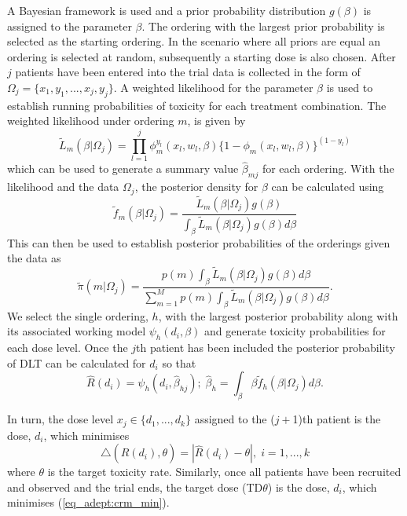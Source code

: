 A Bayesian framework is used and a prior probability distribution $g(\beta)$ is assigned to the parameter $\beta$. The ordering with the largest prior probability is selected as the starting ordering. In the scenario where all priors are equal an ordering is selected at random, subsequently a starting dose is also chosen. After $j$ patients have been entered into the trial data is collected in the form of $\Omega_j = \{x_1,y_1, ..., x_j,y_j\}$. A weighted likelihood for the parameter $\beta$ is used to establish running probabilities of toxicity for each treatment combination. The weighted likelihood under ordering $m$, is given by 
\begin{equation}
\label{eq_adept:likelihood}
\tilde{L}_m(\beta|\Omega_j)=\prod_{l=1}^{j}\phi_m^{y_l}(x_l,w_l,\beta)\{1-\phi_m(x_l,w_l,\beta)\}^{(1-y_l)}
\end{equation} 
which can be used to generate a summary value $\hat{\beta}_{mj}$ for each ordering. With the likelihood and the data $\Omega_j$, the posterior density for $\beta$ can be calculated using 
\begin{equation}
	\tilde{f}_m(\beta|\Omega_j)=\frac{\tilde{L}_m(\beta|\Omega_j)g(\beta)}{\int_{\beta}\tilde{L}_m(\beta|\Omega_j)g(\beta)d\beta}
\end{equation}
This can then be used to establish posterior probabilities of the orderings given the data as 
\begin{equation}
\tilde{\pi}(m|\Omega_j)=\frac{p(m)\int_{\beta}\tilde{L}_m(\beta|\Omega_j)g(\beta)d\beta}{\sum_{m=1}^{M}p(m)\int_{\beta}\tilde{L}_m(\beta|\Omega_j)g(\beta)d\beta}.
\end{equation}
We select the single ordering, $h$, with the largest posterior probability along with its associated working model $\psi_h(d_i,\beta)$ and generate toxicity probabilities for each dose level. Once the $j$th patient has been included the posterior probability of DLT can be calculated for $d_{i}$ so that
\begin{equation}
	\hat{R}(d_i) = \psi_h(d_i,\hat{\beta}_{hj}); \; \hat{\beta}_h = \int_{\beta}\beta\tilde{f}_h(\beta|\Omega_j)d\beta.
\end{equation}

In turn, the dose level $x_j \in \{d_1,...,d_k\}$ assigned to the ($j+$1)th patient is the dose, $d_i$, which minimises 
\begin{equation}
\label{eq_adept:crm_min}
	\triangle(\hat{R}(d_i),\theta) = |\hat{R}(d_i)-\theta|, \; i=1,...,k
\end{equation}
where $\theta$ is the target toxicity rate. Similarly, once all patients have been recruited and observed and the trial ends, the target dose (TD$\theta$) is the dose, $d_{i}$, which minimises (\ref{eq_adept:crm_min}).

